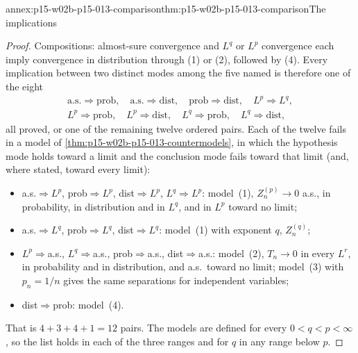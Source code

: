 \begin{annexitem}{annex:p15-w02b-p15-013-comparison}{thm:p15-w02b-p15-013-comparison}{The implications}
\begin{proof}
Compositions: almost-sure convergence and \(L^q\) or \(L^p\)
convergence each imply convergence in distribution through (1) or (2),
followed by (4). Every implication between two distinct modes among
the five named is therefore one of the eight
\[
 \begin{gathered}
 \text{a.s.}\Rightarrow\text{prob},\quad \text{a.s.}\Rightarrow\text{dist},\quad
 \text{prob}\Rightarrow\text{dist},\quad L^p\Rightarrow L^q,\\
 L^p\Rightarrow\text{prob},\quad L^p\Rightarrow\text{dist},\quad
 L^q\Rightarrow\text{prob},\quad L^q\Rightarrow\text{dist},
 \end{gathered}
\]
all proved, or one of the remaining twelve ordered pairs. Each of the
twelve fails in a model of \cref{thm:p15-w02b-p15-013-countermodels},
in which the hypothesis mode holds toward a limit and the conclusion mode
fails toward that limit (and, where stated, toward every limit):
\begin{itemize}
\item a.s.\(\Rightarrow L^p\), prob\(\Rightarrow L^p\),
      dist\(\Rightarrow L^p\), \(L^q\Rightarrow L^p\): model~(1),
      \(Z^{(p)}_n\to0\) a.s., in probability, in distribution and in
      \(L^q\), and in \(L^p\) toward no limit;
\item a.s.\(\Rightarrow L^q\), prob\(\Rightarrow L^q\),
      dist\(\Rightarrow L^q\): model~(1) with exponent \(q\),
      \(Z^{(q)}_n\);
\item \(L^p\Rightarrow\)a.s., \(L^q\Rightarrow\)a.s.,
      prob\(\Rightarrow\)a.s., dist\(\Rightarrow\)a.s.: model~(2),
      \(T_n\to0\) in every \(L^r\), in probability and in distribution,
      and a.s.\ toward no limit; model~(3) with \(p_n=1/n\) gives the
      same separations for independent variables;
\item dist\(\Rightarrow\)prob: model~(4).
\end{itemize}
That is \(4+3+4+1=12\) pairs. The models are defined for every
\(0<q<p<\infty\), so the list holds in each of the three ranges and for
\(q\) in any range below \(p\).
\end{proof}
\end{annexitem}

